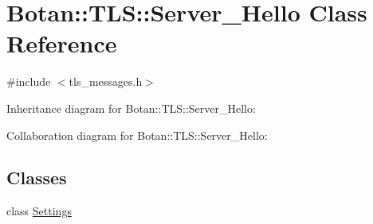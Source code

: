 \hypertarget{class_botan_1_1_t_l_s_1_1_server___hello}{}\section{Botan\+:\+:T\+LS\+:\+:Server\+\_\+\+Hello Class Reference}
\label{class_botan_1_1_t_l_s_1_1_server___hello}


{\ttfamily \#include $<$tls\+\_\+messages.\+h$>$}



Inheritance diagram for Botan\+:\+:T\+LS\+:\+:Server\+\_\+\+Hello\+:


Collaboration diagram for Botan\+:\+:T\+LS\+:\+:Server\+\_\+\+Hello\+:
\subsection*{Classes}
\begin{DoxyCompactItemize}
\item 
class \mbox{\hyperlink{class_botan_1_1_t_l_s_1_1_server___hello_1_1_settings}{Settings}}
\end{DoxyCompactItemize}
